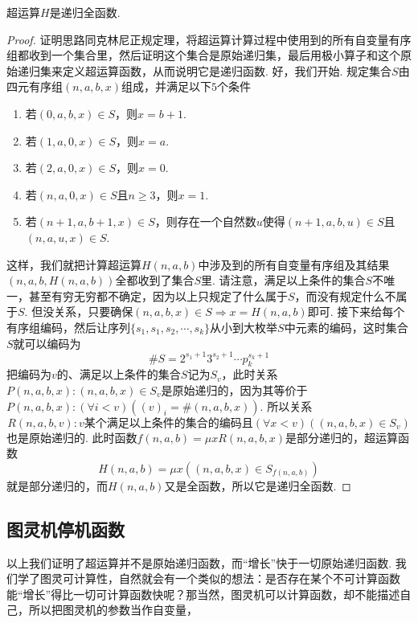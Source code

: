 \begin{proposition}{}
    超运算\(H\)是递归全函数.
\end{proposition}
\begin{proof}
    证明思路同克林尼正规定理，将超运算计算过程中使用到的所有自变量有序组都收到一个集合里，然后证明这个集合是原始递归集，最后用极小算子和这个原始递归集来定义超运算函数，从而说明它是递归函数. 好，我们开始. 规定集合\(S\)由四元有序组\((n,a,b,x)\)组成，并满足以下\(5\)个条件
    \begin{enumerate}
        \item 若\((0,a,b,x) \in S\)，则\(x = b+1\).
        \item 若\((1,a,0,x) \in S\)，则\(x=a\).
        \item 若\((2,a,0,x) \in S\)，则\(x=0\).
        \item 若\((n,a,0,x) \in S\)且\(n \geq 3\)，则\(x=1\).
        \item 若\((n+1,a,b+1,x) \in S\)，则存在一个自然数\(u\)使得\((n+1,a,b,u) \in S\)且\((n,a,u,x) \in S\).
    \end{enumerate}
    这样，我们就把计算超运算\(H(n,a,b)\)中涉及到的所有自变量有序组及其结果\((n,a,b,H(n,a,b))\)全都收到了集合\(S\)里. 请注意，满足以上条件的集合\(S\)不唯一，甚至有穷无穷都不确定，因为以上只规定了什么属于\(S\)，而没有规定什么不属于\(S\). 但没关系，只要确保\((n,a,b,x) \in S \Rightarrow x=H(n,a,b)\)即可. 接下来给每个有序组编码，然后让序列\(\{s_1,s_1,s_2,\cdots,s_k\}\)从小到大枚举\(S\)中元素的编码，这时集合\(S\)就可以编码为
    \[\# S = 2^{s_1+1}3^{s_2+1}\cdots p_k^{s_k+1}\]
    把编码为\(v\)的、满足以上条件的集合\(S\)记为\(S_v\)，此时关系\(P(n,a,b,x): (n,a,b,x) \in S_v\)是原始递归的，因为其等价于\(P(n,a,b,x): (\forall i < v)((v)_i = \# (n,a,b,x))\). 所以关系
    \[R(n,a,b,v): v\mbox{某个满足以上条件的集合的编码且}(\forall x < v)((n,a,b,x) \in S_v)\]
    也是原始递归的. 此时函数\(f(n,a,b) = \mu x R(n,a,b,x)\)是部分递归的，超运算函数
    \[H(n,a,b) = \mu x ((n,a,b,x) \in S_{f(n,a,b)})\]
    就是部分递归的，而\(H(n,a,b)\)又是全函数，所以它是递归全函数.
\end{proof}

\subsection{图灵机停机函数}

以上我们证明了超运算并不是原始递归函数，而“增长”快于一切原始递归函数. 我们学了图灵可计算性，自然就会有一个类似的想法：是否存在某个不可计算函数能“增长”得比一切可计算函数快呢？那当然，图灵机可以计算函数，却不能描述自己，所以把图灵机的参数当作自变量，

